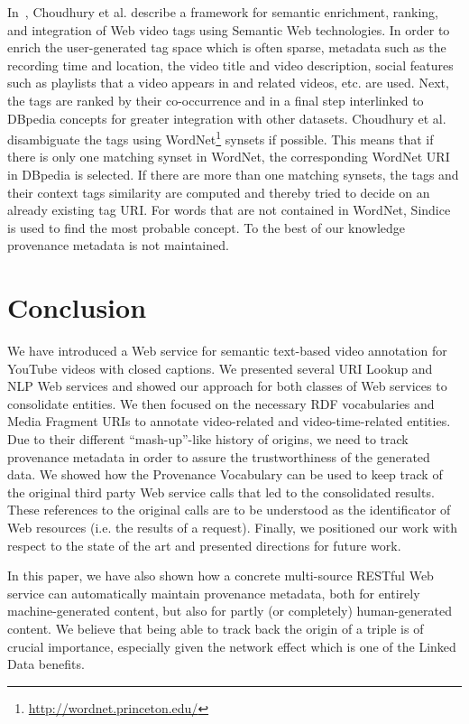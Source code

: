 \documentclass{acm_proc_article-sp}
\begin{document}
In~\cite{Choudhury:YouTube}, Choudhury et al. describe a framework for semantic enrichment, ranking, and integration of
Web video tags using Semantic Web technologies. In order to enrich the user-generated tag space which is often sparse,
metadata such as the recording time and location, the video title and video description, social features such as
playlists that a video appears in and related videos, etc. are used. Next, the tags are ranked by their co-occurrence
and in a final step interlinked to DBpedia concepts for greater integration with other datasets. Choudhury et al.
disambiguate the tags using WordNet\footnote{\url{http://wordnet.princeton.edu/}} synsets if possible. This means that
if there is only one matching synset in WordNet, the corresponding WordNet URI in DBpedia is selected. If there are
more than one matching synsets, the tags and their context tags similarity are computed and thereby tried to decide on
an already existing tag URI. For words that are not contained in WordNet, Sindice is used to find the most probable
concept. To the best of our knowledge provenance metadata is not maintained.


\section{Conclusion}                                                        \label{sec:conclusion}
We have introduced a Web service for semantic text-based video annotation for YouTube videos with closed captions. We
presented several URI Lookup and NLP Web services and showed our approach for both classes of Web services to
consolidate entities. We then focused on the necessary RDF vocabularies and Media Fragment URIs to annotate
video-related and video-time-related entities. Due to their different ``mash-up''-like history of origins, we need to
track provenance metadata in order to assure the trustworthiness of the generated data. We showed how the Provenance
Vocabulary can be used to keep track of the original third party Web service calls that led to the consolidated
results. These references to the original calls are to be understood as the identificator of Web resources (i.e. the
results of a request). Finally, we positioned our work with respect to the state of the art and presented directions
for future work.

In this paper, we have also shown how a concrete multi-source RESTful Web service can automatically maintain provenance
metadata, both for entirely machine-generated content, but also for partly (or completely) human-generated content. We
believe that being able to track back the origin of a triple is of crucial importance, especially given the network
effect which is one of the Linked Data benefits.
\end{document}
